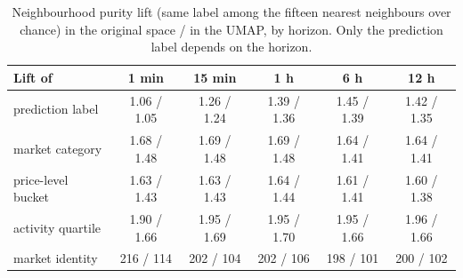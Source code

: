 \begin{table}[p]
\centering
\caption{Neighbourhood purity lift (same label among the fifteen nearest neighbours over
chance) in the original space / in the UMAP, by horizon.  Only the prediction label
depends on the horizon.}
\label{tab:structure:purityh}
\small
\begin{tabular}{lccccc}
\toprule
Lift of & 1 min & 15 min & 1 h & 6 h & 12 h \\
\midrule
prediction label   & 1.06 / 1.05 & 1.26 / 1.24 & 1.39 / 1.36 & 1.45 / 1.39 & 1.42 / 1.35 \\
market category    & 1.68 / 1.48 & 1.69 / 1.48 & 1.69 / 1.48 & 1.64 / 1.41 & 1.64 / 1.41 \\
price-level bucket & 1.63 / 1.43 & 1.63 / 1.43 & 1.64 / 1.44 & 1.61 / 1.41 & 1.60 / 1.38 \\
activity quartile  & 1.90 / 1.66 & 1.95 / 1.69 & 1.95 / 1.70 & 1.95 / 1.66 & 1.96 / 1.66 \\
market identity    & 216 / 114   & 202 / 104   & 202 / 106   & 198 / 101   & 200 / 102 \\
\bottomrule
\end{tabular}
\end{table}

